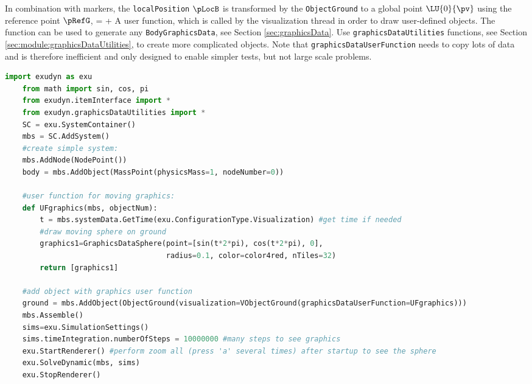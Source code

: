     In combination with markers, the \texttt{localPosition} $\pLocB$ is transformed by the \texttt{ObjectGround} to
    a global point $\LU{0}{\pv}$ using the reference point $\pRefG$,
    \be
       = \pRefG +  \pLocB \eqDot
    \ee
    A user function, which is called by the visualization thread in order to draw user-defined objects.
    The function can be used to generate any \texttt{BodyGraphicsData}, see Section \ref{sec:graphicsData}.
    Use \texttt{graphicsDataUtilities} functions, see Section \ref{sec:module:graphicsDataUtilities}, to create more complicated objects. 
    Note that \texttt{graphicsDataUserFunction} needs to copy lots of data and is therefore
    inefficient and only designed to enable simpler tests, but not large scale problems.
    \finishTable
    \userFunctionExample{}
    \pythonstyle
    \begin{lstlisting}[language=Python]
    import exudyn as exu
    from math import sin, cos, pi
    from exudyn.itemInterface import *
    from exudyn.graphicsDataUtilities import *
    SC = exu.SystemContainer()
    mbs = SC.AddSystem()
    #create simple system:
    mbs.AddNode(NodePoint())
    body = mbs.AddObject(MassPoint(physicsMass=1, nodeNumber=0))
    
    #user function for moving graphics:
    def UFgraphics(mbs, objectNum):
        t = mbs.systemData.GetTime(exu.ConfigurationType.Visualization) #get time if needed
        #draw moving sphere on ground
        graphics1=GraphicsDataSphere(point=[sin(t*2*pi), cos(t*2*pi), 0], 
                                     radius=0.1, color=color4red, nTiles=32)
        return [graphics1] 

    #add object with graphics user function
    ground = mbs.AddObject(ObjectGround(visualization=VObjectGround(graphicsDataUserFunction=UFgraphics)))
    mbs.Assemble()
    sims=exu.SimulationSettings()
    sims.timeIntegration.numberOfSteps = 10000000 #many steps to see graphics
    exu.StartRenderer() #perform zoom all (press 'a' several times) after startup to see the sphere
    exu.SolveDynamic(mbs, sims)
    exu.StopRenderer()
    \end{lstlisting}
